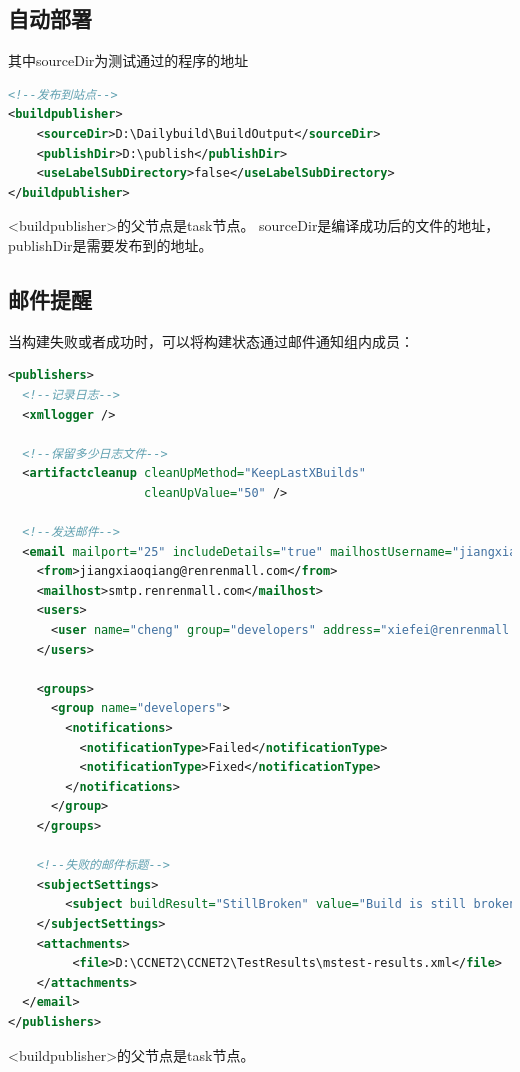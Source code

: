 \documentclass{book}
\begin{document}
\subsection{自动部署}

其中sourceDir为测试通过的程序的地址

\begin{lstlisting}[language=XML]
<!--发布到站点-->
<buildpublisher>
	<sourceDir>D:\Dailybuild\BuildOutput</sourceDir>
	<publishDir>D:\publish</publishDir>
	<useLabelSubDirectory>false</useLabelSubDirectory>
</buildpublisher>
\end{lstlisting}

<buildpublisher>的父节点是task节点。
sourceDir是编译成功后的文件的地址，
publishDir是需要发布到的地址。

\subsection{邮件提醒}

当构建失败或者成功时，可以将构建状态通过邮件通知组内成员：

\begin{lstlisting}[language=XML]
<publishers>  
  <!--记录日志-->  
  <xmllogger />  
    
  <!--保留多少日志文件-->  
  <artifactcleanup cleanUpMethod="KeepLastXBuilds"  
                   cleanUpValue="50" />  
    
  <!--发送邮件-->  
  <email mailport="25" includeDetails="true" mailhostUsername="jiangxiaoqiang@renrenmall.com" mailhostPassword="123456" useSSL="FALSE">  
    <from>jiangxiaoqiang@renrenmall.com</from>  
    <mailhost>smtp.renrenmall.com</mailhost>  
    <users>  
      <user name="cheng" group="developers" address="xiefei@renrenmall.com" />  
    </users>  

    <groups>  
      <group name="developers">  
        <notifications>  
          <notificationType>Failed</notificationType>  
          <notificationType>Fixed</notificationType>  
        </notifications>  
      </group>
    </groups> 

    <!--失败的邮件标题-->  
    <subjectSettings>  
        <subject buildResult="StillBroken" value="Build is still broken for {CCNetProject}" />  
    </subjectSettings>  
    <attachments>  
         <file>D:\CCNET2\CCNET2\TestResults\mstest-results.xml</file>  
    </attachments>
  </email>  
</publishers>
\end{lstlisting}

<buildpublisher>的父节点是task节点。
\end{document}
